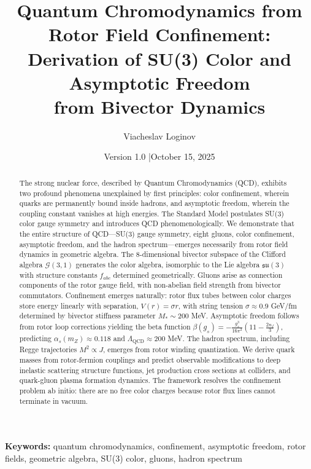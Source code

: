 \documentclass[11pt,a4paper]{article}
\title{\textbf{Quantum Chromodynamics from Rotor Field Confinement: \\
Derivation of SU(3) Color and Asymptotic Freedom \\
from Bivector Dynamics}}
\author[1]{Viacheslav Loginov}
\affil[1]{Kyiv, Ukraine\\ \texttt{barthez.slavik@gmail.com}}
\date{\small Version 1.0 \quad|\quad October 15, 2025}
\newcommand{\Cl}{\mathcal{G}}
\theoremstyle{definition}
\theoremstyle{plain}
\theoremstyle{remark}
\begin{document}
\maketitle

\begin{abstract}
\noindent
The strong nuclear force, described by Quantum Chromodynamics (QCD), exhibits two profound phenomena unexplained by first principles: color confinement, wherein quarks are permanently bound inside hadrons, and asymptotic freedom, wherein the coupling constant vanishes at high energies. The Standard Model postulates SU(3) color gauge symmetry and introduces QCD phenomenologically. We demonstrate that the entire structure of QCD---SU(3) gauge symmetry, eight gluons, color confinement, asymptotic freedom, and the hadron spectrum---emerges necessarily from rotor field dynamics in geometric algebra. The 8-dimensional bivector subspace of the Clifford algebra $\Cl(3,1)$ generates the color algebra, isomorphic to the Lie algebra $\mathfrak{su}(3)$ with structure constants $f_{abc}$ determined geometrically. Gluons arise as connection components of the rotor gauge field, with non-abelian field strength from bivector commutators. Confinement emerges naturally: rotor flux tubes between color charges store energy linearly with separation, $V(r) = \sigma r$, with string tension $\sigma \approx 0.9$ GeV/fm determined by bivector stiffness parameter $M_\ast \sim 200$ MeV. Asymptotic freedom follows from rotor loop corrections yielding the beta function $\beta(g_s) = -\frac{g_s^3}{16\pi^2}(11 - \frac{2n_f}{3})$, predicting $\alpha_s(m_Z) \approx 0.118$ and $\Lambda_{\mathrm{QCD}} \approx 200$ MeV. The hadron spectrum, including Regge trajectories $M^2 \propto J$, emerges from rotor winding quantization. We derive quark masses from rotor-fermion couplings and predict observable modifications to deep inelastic scattering structure functions, jet production cross sections at colliders, and quark-gluon plasma formation dynamics. The framework resolves the confinement problem ab initio: there are no free color charges because rotor flux lines cannot terminate in vacuum.
\end{abstract}

\noindent\textbf{Keywords:} quantum chromodynamics, confinement, asymptotic freedom, rotor fields, geometric algebra, SU(3) color, gluons, hadron spectrum

\tableofcontents
\newpage

\end{document}
